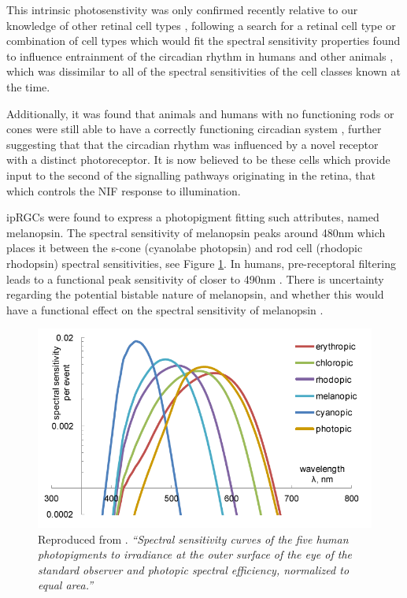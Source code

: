 This intrinsic photosenstivity was only confirmed recently relative to our knowledge of other retinal cell types \citep{qiu_induction_2005}, following a search for a retinal cell type or combination of cell types which would fit the spectral sensitivity properties found to influence entrainment of the circadian rhythm in humans and other animals \citep{brainard_human_2001,brainard_action_2001}, which was dissimilar to all of the spectral sensitivities of the cell classes known at the time.

Additionally, it was found that animals and humans with no functioning rods or cones were still able to have a correctly functioning circadian system \citep{freedman_regulation_1999,zaidi_short-wavelength_2007}, further suggesting that that the circadian rhythm was influenced by a novel receptor with a distinct photoreceptor. It is now believed to be these cells which provide input to the second of the signalling pathways originating in the retina, that which controls the \gls{NIF} response to illumination.

\Glspl{ipRGC} were found to express a photopigment fitting such attributes, named melanopsin. The spectral sensitivity of melanopsin peaks around 480nm \citep{qiu_induction_2005,hankins_primary_2002,dacey_melanopsin-expressing_2005,peirson_melanopsin_2006,bailes_human_2013} which places it between the s-cone (cyanolabe photopsin) and rod cell (rhodopic rhodopsin) spectral sensitivities, see Figure \ref{fig:specsens}. In humans, pre-receptoral filtering leads to a functional peak sensitivity of closer to 490nm \citep{cie_cie_2015-1}. There is uncertainty regarding the potential bistable nature of melanopsin, and whether this would have a functional effect on the spectral sensitivity of melanopsin \citep{cie_cie_2015-1,mure_melanopsin_2009,rollag_does_2008,wada_color_2018}.

\begin{figure}[htbp]
\includegraphics[max width=\textwidth, center]{figs/LitRev/ciemel.png}
\caption{Reproduced from \citet{cie_cie_2015-1}. \textit{``Spectral sensitivity curves of the five human photopigments to irradiance at the outer surface of the eye of the standard observer and photopic spectral efficiency, normalized to equal area.''}}
\label{fig:specsens}
\end{figure}

